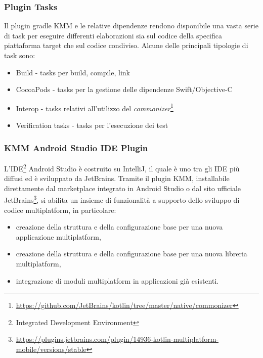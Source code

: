 \subsubsection{Plugin Tasks}
Il plugin gradle KMM e le relative dipendenze rendono disponibile una vasta serie di task per eseguire differenti elaborazioni sia sul codice della specifica piattaforma target che sul codice condiviso. Alcune delle principali tipologie di task sono:
\begin{itemize}
    \item Build - tasks per build, compile, link
    \item CocoaPods - tasks per la gestione delle dipendenze Swift/Objective-C
    \item Interop - tasks relativi all'utilizzo del \textit{commonizer}\footnote{\url{https://github.com/JetBrains/kotlin/tree/master/native/commonizer}}
    \item Verification tasks - tasks per l'esecuzione dei test
\end{itemize}

\subsubsection{KMM Android Studio IDE Plugin}
L'IDE\footnote{Integrated Development Environment} Android Studio è costruito su IntelliJ, il quale è uno tra gli IDE più diffusi ed è sviluppato da JetBrains. Tramite il plugin KMM, installabile direttamente dal marketplace integrato in Android Studio o dal sito ufficiale JetBrains\footnote{\url{https://plugins.jetbrains.com/plugin/14936-kotlin-multiplatform-mobile/versions/stable}}, si abilita un insieme di funzionalità a supporto dello sviluppo di codice multiplatform, in particolare:
\begin{itemize}
    \item creazione della struttura e della configurazione base per una nuova applicazione multiplatform,
    \item creazione della struttura e della configurazione base per una nuova libreria multiplatform,
    \item integrazione di moduli multiplatform in applicazioni già esistenti.
\end{itemize}

